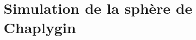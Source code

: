 \chapter{Simulation de la sphère de Chaplygin}

\newcommand{\arediger}[1]{{\color{gray}\itshape À rédiger : #1}}



